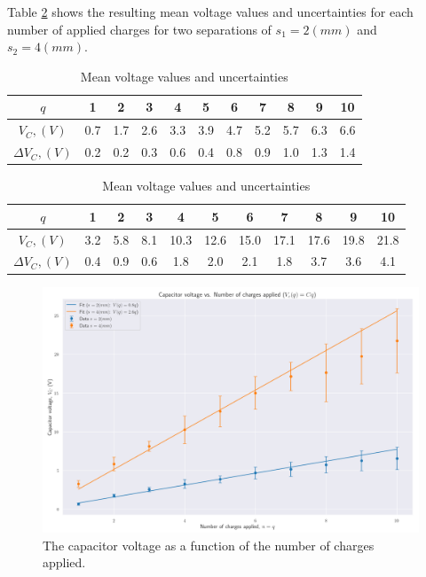 Table \ref{tab:results:exp1} shows the resulting mean voltage values and uncertainties for each number of applied charges for two separations of $s_1 = 2(mm)$ and $s_2 = 4(mm)$.
\begin{table}[H]
    \centering
    \begin{minipage}{\textwidth}
        \centering
        \begin{tabular}{|c|cccccccccc|}
             \hline
             $q$               & 1 & 2 & 3 & 4 & 5 & 6 & 7 & 8 & 9 & 10 \\
             \hline
             $V_C, (V)$        & 0.7 & 1.7 & 2.6 & 3.3 & 3.9 & 4.7 & 5.2 & 5.7 & 6.3 & 6.6 \\
             $\Delta V_C, (V)$ & 0.2 & 0.2 & 0.3 & 0.6 & 0.4 & 0.8 & 0.9 & 1.0 & 1.3 & 1.4 \\ 
             \hline
        \end{tabular}
        \caption{$s_1 = 2(mm)$}
    \end{minipage}

    \vspace{0.5cm}
    
    \begin{minipage}{\textwidth}
        \centering
        \begin{tabular}{|c|cccccccccc|}
             \hline
             $q$               & 1 & 2 & 3 & 4 & 5 & 6 & 7 & 8 & 9 & 10 \\
             \hline
             $V_C, (V)$        & 3.2 & 5.8 & 8.1 & 10.3 & 12.6 & 15.0 & 17.1 & 17.6 & 19.8 & 21.8 \\
             $\Delta V_C, (V)$ & 0.4 & 0.9 & 0.6 & 1.8 & 2.0 & 2.1 & 1.8 & 3.7 & 3.6 & 4.1  \\ 
             \hline
        \end{tabular}
        \caption{$s_2 = 4(mm)$}
    \end{minipage}

    \caption{Mean voltage values and uncertainties}
    \label{tab:results:exp1}
\end{table}

\begin{figure}[H]
    \centering
    \includegraphics[width=\textwidth]{capacitors/img/capacitor_voltage_graph.png}
    \caption{The capacitor voltage as a function of the number of charges applied.}
    \label{fig:results:exp1}
\end{figure}

